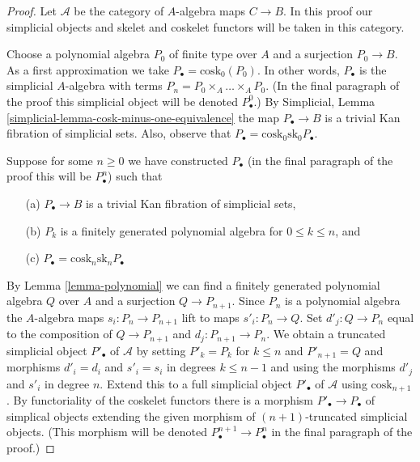 \begin{proof}
Let $\mathcal{A}$ be the category of $A$-algebra maps $C \to B$.
In this proof our simplicial objects and skelet and coskelet
functors will be taken in this category.

\medskip\noindent
Choose a polynomial algebra $P_0$ of finite type over $A$ and a surjection
$P_0 \to B$. As a first approximation we take
$P_\bullet = \text{cosk}_0(P_0)$. In other words, $P_\bullet$ is the simplicial
$A$-algebra with terms $P_n = P_0 \times_A \ldots \times_A P_0$.
(In the final paragraph of the proof this simplicial object will
be denoted $P^0_\bullet$.) By
Simplicial, Lemma \ref{simplicial-lemma-cosk-minus-one-equivalence}
the map $P_\bullet \to B$ is a trivial Kan fibration of simplicial sets.
Also, observe that $P_\bullet = \text{cosk}_0 \text{sk}_0 P_\bullet$.

\medskip\noindent
Suppose for some $n \geq 0$ we have constructed $P_\bullet$
(in the final paragraph of the proof this will be $P^n_\bullet$)
such that
\begin{enumerate}
\item[(a)] $P_\bullet \to B$ is a trivial Kan fibration of simplicial sets,
\item[(b)] $P_k$ is a finitely generated polynomial algebra for
$0 \leq k \leq n$, and
\item[(c)] $P_\bullet = \text{cosk}_n \text{sk}_n P_\bullet$
\end{enumerate}
By Lemma \ref{lemma-polynomial}
we can find a finitely generated polynomial algebra $Q$ over $A$
and a surjection $Q \to P_{n + 1}$. Since $P_n$ is a polynomial algebra
the $A$-algebra maps $s_i : P_n \to P_{n + 1}$ lift to maps
$s'_i : P_n \to Q$. Set $d'_j : Q \to P_n$ equal to the composition of
$Q \to P_{n + 1}$ and $d_j : P_{n + 1} \to P_n$.
We obtain a truncated simplicial object $P'_\bullet$ of $\mathcal{A}$
by setting $P'_k = P_k$ for $k \leq n$ and $P'_{n + 1} = Q$ and morphisms
$d'_i = d_i$ and $s'_i = s_i$ in degrees $k \leq n - 1$ and using the
morphisms $d'_j$ and $s'_i$ in degree $n$. Extend this to a full simplicial
object $P'_\bullet$ of $\mathcal{A}$ using $\text{cosk}_{n + 1}$. By
functoriality of the coskelet functors there is a morphism
$P'_\bullet \to P_\bullet$ of simplical objects extending the
given morphism of $(n + 1)$-truncated simplicial objects.
(This morphism will be denoted $P^{n + 1}_\bullet \to P^n_\bullet$
in the final paragraph of the proof.)


\end{proof}

